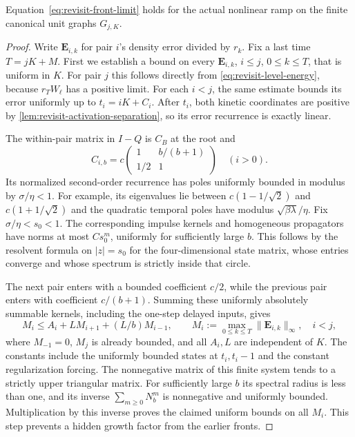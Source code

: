 \begin{theorem}
\label{thm:revisit-front-limit}
Equation~\eqref{eq:revisit-front-limit} holds for the actual nonlinear
ramp on the finite canonical unit graphs $G_{j,K}$.
\end{theorem}
\begin{proof}
Write $\mathbf E_{i,k}$ for pair $i$'s density error divided by $r_k$.
Fix a last time $T=jK+M$. First we establish a bound on every
$\mathbf E_{i,k}$, $i\leq j$, $0\leq k\leq T$, that is uniform in $K$.
For pair $j$ this follows directly from
\cref{eq:revisit-level-energy}, because $r_TW_\ell$ has a positive
limit. For each $i<j$, the same estimate bounds its error uniformly up
to $t_i=iK+C_i$. After $t_i$, both kinetic coordinates are positive
by \cref{lem:revisit-activation-separation}, so its error recurrence
is exactly linear.

The within-pair matrix in $I-Q$ is $C_B$ at the root and
\[
 C_{i,b}=c\begin{pmatrix}1&b/(b+1)\\1/2&1\end{pmatrix}
 \quad(i>0).
\]
Its normalized second-order recurrence has poles uniformly bounded in
modulus by $\sigma/\eta<1$. For example, its eigenvalues lie between
$c(1-1/\sqrt2)$ and $c(1+1/\sqrt2)$ and the quadratic temporal poles
have modulus $\sqrt{\beta\lambda}/\eta$. Fix
$\sigma/\eta<s_0<1$. The corresponding impulse kernels and homogeneous
propagators have norms at most $C s_0^m$, uniformly for sufficiently
large $b$. This follows by the resolvent formula on $|z|=s_0$ for the
four-dimensional state matrix, whose entries converge and whose spectrum
is strictly inside that circle.

The next pair enters with a bounded coefficient $c/2$, while the previous
pair enters with coefficient $c/(b+1)$. Summing these uniformly
absolutely summable kernels, including the one-step delayed inputs, gives
\[
 M_i\leq A_i+L M_{i+1}+(L/b)M_{i-1},\qquad
 M_i:=\max_{0\leq k\leq T}\|\mathbf E_{i,k}\|_\infty,
 \quad i<j,
\]
where $M_{-1}=0$, $M_j$ is already bounded, and all $A_i,L$ are
independent of $K$. The constants include the uniformly bounded states
at $t_i,t_i-1$ and the constant regularization forcing.
The nonnegative matrix of this finite system tends to a strictly upper
triangular matrix. For sufficiently large $b$ its spectral radius is
less than one, and its inverse $\sum_{m\geq0}N_b^m$ is nonnegative
and uniformly bounded. Multiplication by this inverse proves the claimed
uniform bounds on all $M_i$. This step prevents a hidden growth factor
from the earlier fronts.


\end{proof}
